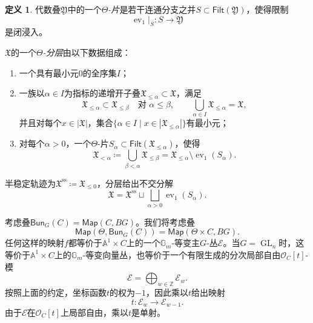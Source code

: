 \documentclass{amsart}
\theoremstyle{definition}
\newtheorem{defn}[thm]{定义}
\theoremstyle{remark}
\theoremstyle{plain}
\theoremstyle{definition}
\theoremstyle{remark}
\newcommand{\A}{\mathbb{A}}
\newcommand{\G}{\mathbb{G}}
\newcommand{\Z}{\mathbb{Z}}
\newcommand{\mc}[1]{\mathcal{#1}}
\newcommand{\mf}[1]{\mathfrak{#1}}
\newcommand{\mr}[1]{\mathrm{#1}}
\newcommand{\on}[1]{\operatorname{#1}}
\newcommand{\ms}[1]{\mathsf{#1}}
\newcommand{\1}{\mathbf{1}}
\newcommand{\2}{\mathbf{2}}
\newcommand{\3}{\mathbf{3}}
\DeclareMathOperator{\ev}{ev}
\begin{document}
\begin{defn}
    代数叠\(\mf{Y}\)中的一个\textit{\(\Theta\)-片}是若干连通分支之并\(S\subset\ms{Filt}(\mf{Y})\)，使得限制
    \[
        \ev_1|_S\colon S\longrightarrow\mf{Y}
    \]
    是闭浸入。

    \(\mf{X}\)的一个\textit{\(\Theta\)-分层}由以下数据组成：
    \begin{enumerate}
        \item 一个具有最小元\(0\)的全序集\(I\)；
        \item 一族以\(\alpha\in I\)为指标的递增开子叠\(\mf{X}_{\leq\alpha}\subset\mf{X}\)，满足
        \[
            \mf{X}_{\leq\alpha}\subset\mf{X}_{\leq\beta}
            \quad\text{对 }\alpha\leq\beta,
            \qquad
            \bigcup_{\alpha\in I}\mf{X}_{\leq\alpha}=\mf{X},
        \]
        并且对每个\(x\in|\mf{X}|\)，集合\(\{\alpha\in I\mid x\in|\mf{X}_{\leq\alpha}|\}\)有最小元；
        \item 对每个\(\alpha>0\)，一个\(\Theta\)-片\(S_\alpha\subset\ms{Filt}(\mf{X}_{\leq\alpha})\)，使得
        \[
            \mf{X}_{<\alpha}
            \coloneqq
            \bigcup_{\beta<\alpha}\mf{X}_{\leq\beta}
            =
            \mf{X}_{\leq\alpha}\setminus\ev_1(S_\alpha).
        \]
    \end{enumerate}
    半稳定轨迹为\(\mf{X}^{\mr{ss}}\coloneqq\mf{X}_{\leq0}\)，分层给出不交分解
    \[
        \mf{X}
        =
        \mf{X}^{\mr{ss}}
        \sqcup
        \bigsqcup_{\alpha>0}\ev_1(S_\alpha).
    \]
\end{defn}

考虑叠\(\ms{Bun}_G(C) = \ms{Map}(C, BG)\)。我们将考虑叠
\[ \ms{Map}(\Theta, \ms{Bun}_G(C)) = \ms{Map}(\Theta \times C, BG). \]
任何这样的映射\(f\)都等价于\(\A^1\times C\)上的一个\(\G_m\)-等变主\(G\)-丛\(\mc{E}\)。当\(G=\on{GL}_n\)时，这等价于\(\A^1\times C\)上的\(\G_m\)-等变向量丛，也等价于一个有限生成的分次局部自由\(\mc{O}_C[t]\)-模
\[
    \mc{E}=\bigoplus_{w\in\Z}\mc{E}_w.
\]
按照上面的约定，坐标函数\(t\)的权为\(-1\)，因此乘以\(t\)给出映射
\[
    t\colon\mc{E}_w\longrightarrow\mc{E}_{w-1}.
\]
由于\(\mc{E}\)在\(\mc{O}_C[t]\)上局部自由，乘以\(t\)是单射。
\end{document}
